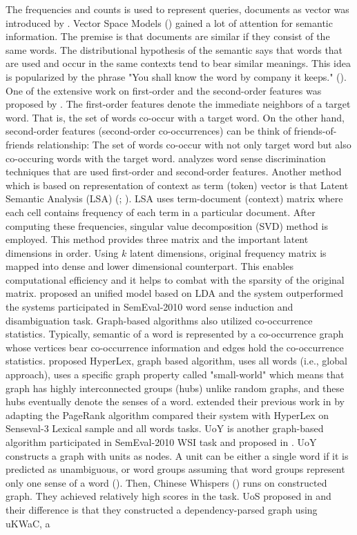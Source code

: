 The frequencies and counts is used to represent queries, documents as vector was introduced by \cite{salton75vector}. Vector Space Models (\cite{turney10frequency}) gained a lot of attention for semantic information. The premise is that documents are similar if they consist of the same words. The distributional hypothesis of the semantic says that words that are used and occur in the same contexts tend to bear similar meanings. This idea is popularized by the phrase "You shall know the word by company it keeps." (\cite{firth57synopsis}). One of the extensive work on first-order and the second-order features was proposed by \cite{schutze98automatic}. The first-order features denote the immediate neighbors of a target word. That is, the set of words co-occur with a target word. On the other hand, second-order features (second-order co-occurrences) can be think of friends-of-friends relationship: The set of words co-occur with not only target word but also co-occuring words with the target word. \cite{purandare04discriminating} analyzes word sense discrimination techniques that are used first-order and second-order features.  Another method which is based on representation of context as term (token) vector is that Latent Semantic Analysis (LSA) (\cite{deerwester90indexing}; \cite{landauer1997solution}). LSA uses term-document (context) matrix where each cell contains frequency of each term in a particular document. After computing these frequencies, singular value decomposition (SVD) method is employed. This method provides three matrix and the important latent dimensions in order. Using $k$ latent dimensions, original frequency matrix is mapped into dense and lower dimensional counterpart. This enables computational efficiency and it helps to combat with the sparsity of the original matrix. \cite{vandecruys11latent} proposed an unified model based on LDA and the system outperformed the systems participated in SemEval-2010 word sense induction and disambiguation task. Graph-based algorithms also utilized co-occurrence statistics. Typically, semantic of a word is represented by a co-occurrence graph whose vertices bear co-occurrence information and edges hold the co-occurrence statistics. \cite{veronis04hyperlex} proposed HyperLex, graph based algorithm, uses all words (i.e., global approach), uses a specific graph property called "small-world" which means that graph has highly interconnected groups (hubs) unlike random graphs, and these hubs eventually denote the senses of a word. \cite{agirre2006two} extended their previous work in \cite{agirre06evaluating}  by adapting the PageRank algorithm \cite{page1999pagerank} compared their system with HyperLex on Senseval-3 Lexical sample and all words tasks. UoY is another graph-based algorithm participated in SemEval-2010 WSI task and proposed in \cite{korkontzelos10uoy}. UoY constructs a graph with units as nodes. A unit can be either a single word if it is predicted as unambiguous, or word groups assuming that word groups represent only one sense of a word (\cite{klapaftis08word}). Then, Chinese Whispers (\cite{biemann06chinese}) runs on constructed graph. They achieved relatively high scores in the task. UoS proposed in \cite{hope2013uos} and their difference is that they constructed a dependency-parsed graph using uKWaC, a 